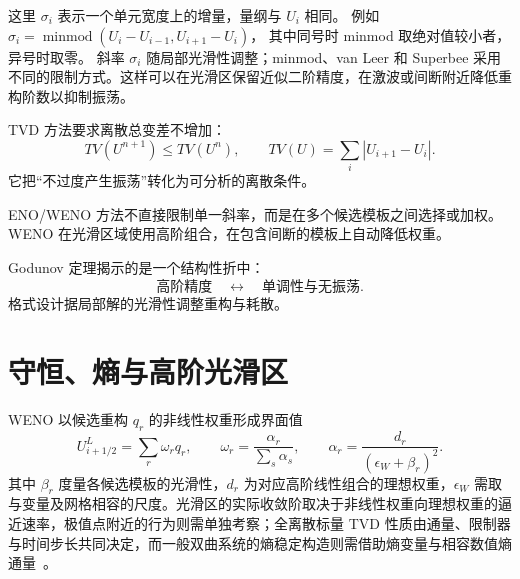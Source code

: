这里 $\sigma_i$ 表示一个单元宽度上的增量，量纲与 $U_i$ 相同。
例如 $\sigma_i=\operatorname{minmod}(U_i-U_{i-1},U_{i+1}-U_i)$，
其中同号时 minmod 取绝对值较小者，异号时取零。
斜率 \(\sigma_i\) 随局部光滑性调整；minmod、van Leer 和 Superbee 采用不同的限制方式。这样可以在光滑区保留近似二阶精度，在激波或间断附近降低重构阶数以抑制振荡。

TVD 方法要求离散总变差不增加：
\[
TV(U^{n+1})\le TV(U^n),
\qquad
TV(U)=\sum_i|U_{i+1}-U_i|.
\]
它把“不过度产生振荡”转化为可分析的离散条件。

ENO/WENO 方法不直接限制单一斜率，而是在多个候选模板之间选择或加权。WENO 在光滑区域使用高阶组合，在包含间断的模板上自动降低权重。

Godunov 定理揭示的是一个结构性折中：
\[
\text{高阶精度}
\quad\leftrightarrow\quad
\text{单调性与无振荡}.
\]
格式设计据局部解的光滑性调整重构与耗散。

\section{守恒、熵与高阶光滑区}
WENO 以候选重构 $q_r$ 的非线性权重形成界面值
\[
U_{i+1/2}^{L}=\sum_r\omega_rq_r,\qquad
\omega_r=\frac{\alpha_r}{\sum_s\alpha_s},\qquad
\alpha_r=\frac{d_r}{(\epsilon_W+\beta_r)^2}.
\]
其中 $\beta_r$ 度量各候选模板的光滑性，$d_r$ 为对应高阶线性组合的理想权重，$\epsilon_W$ 需取与变量及网格相容的尺度。光滑区的实际收敛阶取决于非线性权重向理想权重的逼近速率，极值点附近的行为则需单独考察；全离散标量 TVD 性质由通量、限制器与时间步长共同决定，而一般双曲系统的熵稳定构造则需借助熵变量与相容数值熵通量~\cite{jiang1996}。
